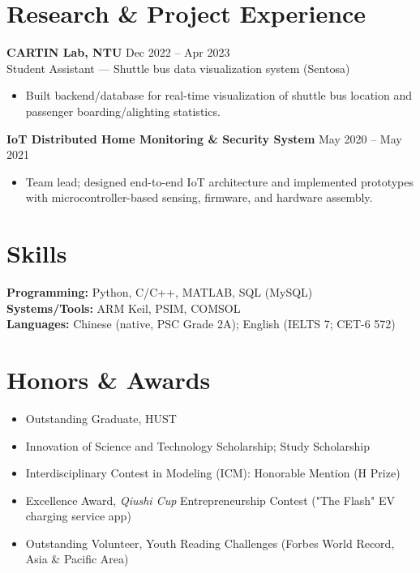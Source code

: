 \documentclass[11pt,a4paper]{article}
\begin{document}
\section*{Research \& Project Experience}
\textbf{CARTIN Lab, NTU} \hfill Dec 2022 -- Apr 2023\\
Student Assistant --- Shuttle bus data visualization system (Sentosa)\\[-2pt]
\begin{itemize}
  \item Built backend/database for real-time visualization of shuttle bus location and passenger boarding/alighting statistics.
\end{itemize}

\textbf{IoT Distributed Home Monitoring \& Security System} \hfill May 2020 -- May 2021\\[-2pt]
\begin{itemize}
  \item Team lead; designed end-to-end IoT architecture and implemented prototypes with microcontroller-based sensing, firmware, and hardware assembly.
\end{itemize}

\section*{Skills}
\textbf{Programming:} Python, C/C++, MATLAB, SQL (MySQL)\\
\textbf{Systems/Tools:} ARM Keil, PSIM, COMSOL\\
\textbf{Languages:} Chinese (native, PSC Grade 2A); English (IELTS 7; CET-6 572)

\section*{Honors \& Awards}
\begin{itemize}
  \item Outstanding Graduate, HUST
  \item Innovation of Science and Technology Scholarship; Study Scholarship
  \item Interdisciplinary Contest in Modeling (ICM): Honorable Mention (H Prize)
  \item Excellence Award, \emph{Qiushi Cup} Entrepreneurship Contest ("The Flash" EV charging service app)
  \item Outstanding Volunteer, Youth Reading Challenges (Forbes World Record, Asia \& Pacific Area)
\end{itemize}
\end{document}
